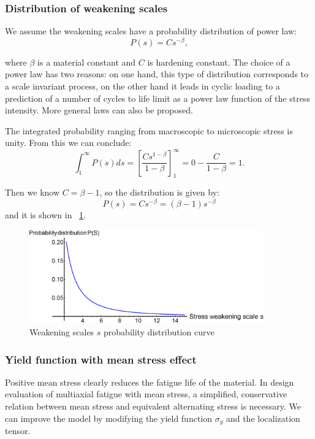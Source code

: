 \documentclass[3p,times,procedia,number]{elsarticle}
\newcommand{\figref}[1]{\figurename~\ref{#1}}
\begin{document}
\vspace{6pt}

\subsubsection{Distribution of weakening scales}

We assume the weakening scales have a  probability distribution of power law: 
$$P(s) = Cs^{-\beta},$$

where $\beta$ is a material constant and $C$ is hardening constant. 
The choice of a power law has two reasons: on one hand, this type of distribution corresponds to a scale invariant process, on the other hand it leads in cyclic loading to a prediction of a number of cycles to life limit as a power law function of the stress intensity. More general laws can also be proposed.

The integrated probability ranging from macroscopic to microscopic stress  is unity. From this we can conclude:
$$\int_{1}^{\infty}P(s)ds=\left[ \frac{Cs^{1-\beta}}{1-\beta}\right] _{1}^{\infty}=0-\frac{C}{1-\beta}=1.$$


Then we know $C=\beta-1$, so the distribution is given by:
$$P(s) = Cs^{-\beta}=(\beta-1)s^{-\beta}$$ and it is shown in \figref{ps}.
\begin{figure}[!h]
	\centering
	\includegraphics[width=0.9\textwidth]{figures//ps.png} 
	\caption{Weakening scales $s$ probability distribution curve}
	\label{ps}
\end{figure}


\subsubsection{Yield function with mean stress effect}

Positive mean stress clearly reduces the fatigue life of the material. In design evaluation of multiaxial fatigue with mean stress, a simplified, conservative relation between mean stress and equivalent alternating stress is necessary. We can improve the model by modifying the yield function $\sigma_y$ and the localization tensor.
\end{document}
